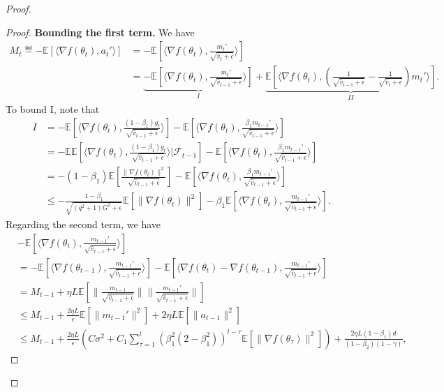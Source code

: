 \documentclass[11pt]{article}
\begin{document}
\begin{proof}
\begin{proof}
\textbf{Bounding the first term.} We have
\begin{align*}
    M_t\eqdef -\mathbb E[\langle \nabla f(\theta_t), a_t'\rangle]&=-\mathbb E[\langle \nabla f(\theta_t), \frac{m_t'}{\sqrt{\hat v_t+\epsilon}}\rangle]\\
    &=\underbrace{-\mathbb E[\langle \nabla f(\theta_t), \frac{m_t'}{\sqrt{\hat v_{t-1}+\epsilon}} \rangle]}_{I}+\underbrace{\mathbb E[\langle \nabla f(\theta_t), (\frac{1}{\sqrt{\hat v_{t-1}+\epsilon}}-\frac{1}{\sqrt{\hat v_t+\epsilon}})m_t' \rangle]}_{II}.
\end{align*}
To bound I, note that
\begin{align*}
    I&=-\mathbb E[\langle \nabla f(\theta_t), \frac{(1-\beta_1)g_t}{\sqrt{\hat v_{t-1}+\epsilon}} \rangle] -\mathbb E[\langle \nabla f(\theta_t), \frac{\beta_1 m_{t-1}'}{\sqrt{\hat v_{t-1}+\epsilon}} \rangle]\\
    &=-\mathbb E\mathbb E[\langle \nabla f(\theta_t), \frac{(1-\beta_1)g_t}{\sqrt{\hat v_{t-1}+\epsilon}} \rangle|\mathcal F_{t-1}] -\mathbb E[\langle \nabla f(\theta_t), \frac{\beta_1 m_{t-1}'}{\sqrt{\hat v_{t-1}+\epsilon}} \rangle]\\
    &=-(1-\beta_1)\mathbb E[\frac{\|\nabla f(\theta_t)\|^2}{\sqrt{\hat v_{t-1}+\epsilon}}] - \mathbb E[\langle \nabla f(\theta_t), \frac{\beta_1 m_{t-1}'}{\sqrt{\hat v_{t-1}+\epsilon}} \rangle]\\
    &\leq -\frac{1-\beta_1}{\sqrt{(q^2+1)G^2+\epsilon}}\mathbb E[\|\nabla f(\theta_t)\|^2]- \beta_1\mathbb E[\langle \nabla f(\theta_t), \frac{ m_{t-1}'}{\sqrt{\hat v_{t-1}+\epsilon}} \rangle].
\end{align*}
Regarding the second term, we have
\begin{align*}
    &- \mathbb E[\langle \nabla f(\theta_t), \frac{ m_{t-1}'}{\sqrt{\hat v_{t-1}+\epsilon}} \rangle]\\
    &=-\mathbb E[\langle\nabla f(\theta_{t-1}), \frac{ m_{t-1}'}{\sqrt{\hat v_{t-1}+\epsilon}} \rangle]- \mathbb E[\langle \nabla f(\theta_t)-\nabla f(\theta_{t-1}), \frac{ m_{t-1}'}{\sqrt{\hat v_{t-1}+\epsilon}} \rangle]\\
    &=M_{t-1}+ \eta L\mathbb E[\|\frac{m_{t-1}}{\sqrt{\hat v_{t-1}+\epsilon}}\| \|\frac{m_{t-1}'}{\sqrt{\hat v_{t-1}+\epsilon}}\|]\\
    &\leq M_{t-1}+\frac{2\eta L}{\epsilon}\mathbb E[\|m_{t-1}'\|^2]+2\eta L\mathbb E[\|a_{t-1}\|^2]\\
    &\leq M_{t-1}+\frac{2\eta L}{\epsilon}(C\sigma^2+C_1\sum_{\tau=1}^t (\beta_1^2(2-\beta_1^2))^{t-\tau}\mathbb E[\|\nabla f(\theta_\tau)\|^2])+\frac{2\eta L(1-\beta_1)d}{(1-\beta_2)(1-\gamma)},

\end{align*}
\end{proof}
\end{proof}
\end{document}
